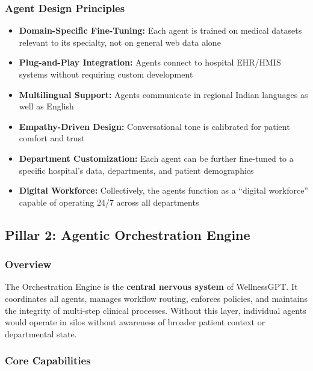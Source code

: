 \documentclass[12pt,a4paper]{article}
\begin{document}
\subsubsection{Agent Design Principles}

\begin{itemize}[noitemsep]
    \item \textbf{Domain-Specific Fine-Tuning:} Each agent is trained on medical datasets relevant to its specialty, not on general web data alone
    \item \textbf{Plug-and-Play Integration:} Agents connect to hospital EHR/HMIS systems without requiring custom development
    \item \textbf{Multilingual Support:} Agents communicate in regional Indian languages as well as English
    \item \textbf{Empathy-Driven Design:} Conversational tone is calibrated for patient comfort and trust
    \item \textbf{Department Customization:} Each agent can be further fine-tuned to a specific hospital's data, departments, and patient demographics
    \item \textbf{Digital Workforce:} Collectively, the agents function as a ``digital workforce'' capable of operating 24/7 across all departments
\end{itemize}

\subsection{Pillar 2: Agentic Orchestration Engine}

\subsubsection{Overview}

The Orchestration Engine is the \textbf{central nervous system} of WellnessGPT. It coordinates all agents, manages workflow routing, enforces policies, and maintains the integrity of multi-step clinical processes. Without this layer, individual agents would operate in silos without awareness of broader patient context or departmental state.

\subsubsection{Core Capabilities}
\end{document}
